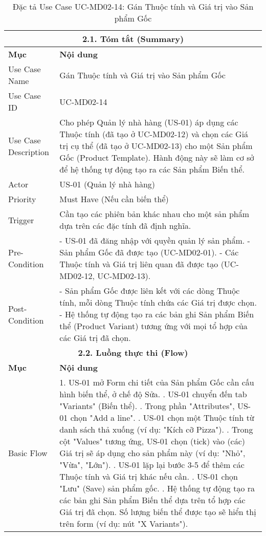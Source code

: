 \begin{longtable}{|m{4cm}|p{11cm}|}
\caption{Đặc tả Use Case UC-MD02-14: Gán Thuộc tính và Giá trị vào Sản phẩm Gốc} \label{tab:uc_md02_14_revised} \\
\hline
\multicolumn{2}{|c|}{\textbf{2.1. Tóm tắt (Summary)}} \\
\hline
\textbf{Mục} & \textbf{Nội dung} \\
\hline
\endhead %
\hline
\endfoot %
\hline
\endlastfoot %
Use Case Name & Gán Thuộc tính và Giá trị vào Sản phẩm Gốc \\
\hline
Use Case ID & UC-MD02-14 \\
\hline
Use Case Description & Cho phép Quản lý nhà hàng (US-01) áp dụng các Thuộc tính (đã tạo ở UC-MD02-12) và chọn các Giá trị cụ thể (đã tạo ở UC-MD02-13) cho một Sản phẩm Gốc (Product Template). Hành động này sẽ làm cơ sở để hệ thống tự động tạo ra các Sản phẩm Biến thể. \\
\hline
Actor & US-01 (Quản lý nhà hàng) \\
\hline
Priority & Must Have (Nếu cần biến thể) \\
\hline
Trigger & Cần tạo các phiên bản khác nhau cho một sản phẩm dựa trên các đặc tính đã định nghĩa. \\
\hline
Pre-Condition & - US-01 đã đăng nhập với quyền quản lý sản phẩm. \newline - Sản phẩm Gốc đã được tạo (UC-MD02-01). \newline - Các Thuộc tính và Giá trị liên quan đã được tạo (UC-MD02-12, UC-MD02-13). \\
\hline
Post-Condition & - Sản phẩm Gốc được liên kết với các dòng Thuộc tính, mỗi dòng Thuộc tính chứa các Giá trị được chọn. \newline - Hệ thống tự động tạo ra các bản ghi Sản phẩm Biến thể (Product Variant) tương ứng với mọi tổ hợp của các Giá trị đã chọn. \\
\hline
\multicolumn{2}{|c|}{\textbf{2.2. Luồng thực thi (Flow)}} \\
\hline
\textbf{Mục} & \textbf{Nội dung} \\
\hline
Basic Flow & 1. US-01 mở Form chi tiết của Sản phẩm Gốc cần cấu hình biến thể, ở chế độ Sửa. \newline 2. US-01 chuyển đến tab "Variants" (Biến thể). \newline 3. Trong phần "Attributes", US-01 chọn "Add a line". \newline 4. US-01 chọn một Thuộc tính từ danh sách thả xuống (ví dụ: "Kích cỡ Pizza"). \newline 5. Trong cột "Values" tương ứng, US-01 chọn (tick) vào (các) Giá trị sẽ áp dụng cho sản phẩm này (ví dụ: "Nhỏ", "Vừa", "Lớn"). \newline 6. US-01 lặp lại bước 3-5 để thêm các Thuộc tính và Giá trị khác nếu cần. \newline 7. US-01 chọn "Lưu" (Save) sản phẩm gốc. \newline 8. Hệ thống tự động tạo ra các bản ghi Sản phẩm Biến thể dựa trên tổ hợp các Giá trị đã chọn. Số lượng biến thể được tạo sẽ hiển thị trên form (ví dụ: nút "X Variants"). \\

\end{longtable}
